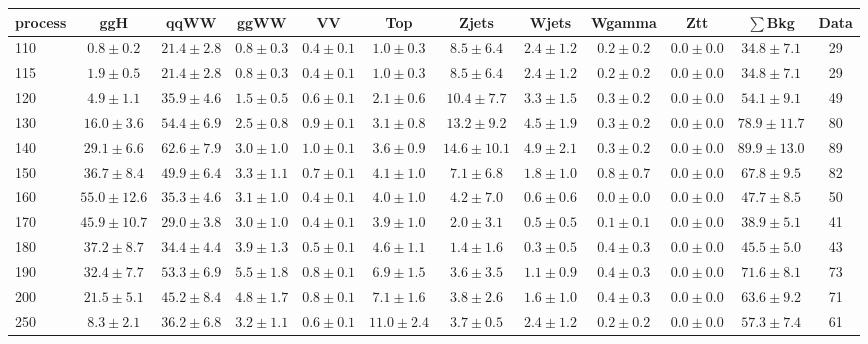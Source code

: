 \begin{table}
{\tiny
 \tiny
 \begin{center}
 \begin{tabular}{l c c c c c c c c c c c }
 \hline
 process & ggH & qqWW & ggWW & VV & Top & Zjets & Wjets & Wgamma & Ztt & $\sum$Bkg & Data \\
 \hline
110 & $0.8\pm0.2$ & $21.4\pm2.8$ & $0.8\pm0.3$ & $0.4\pm0.1$ & $1.0\pm0.3$ & $8.5\pm6.4$ & $2.4\pm1.2$ & $0.2\pm0.2$ & $0.0\pm0.0$ & $34.8\pm7.1$ & 29 \\
115 & $1.9\pm0.5$ & $21.4\pm2.8$ & $0.8\pm0.3$ & $0.4\pm0.1$ & $1.0\pm0.3$ & $8.5\pm6.4$ & $2.4\pm1.2$ & $0.2\pm0.2$ & $0.0\pm0.0$ & $34.8\pm7.1$ & 29 \\
120 & $4.9\pm1.1$ & $35.9\pm4.6$ & $1.5\pm0.5$ & $0.6\pm0.1$ & $2.1\pm0.6$ & $10.4\pm7.7$ & $3.3\pm1.5$ & $0.3\pm0.2$ & $0.0\pm0.0$ & $54.1\pm9.1$ & 49 \\
130 & $16.0\pm3.6$ & $54.4\pm6.9$ & $2.5\pm0.8$ & $0.9\pm0.1$ & $3.1\pm0.8$ & $13.2\pm9.2$ & $4.5\pm1.9$ & $0.3\pm0.2$ & $0.0\pm0.0$ & $78.9\pm11.7$ & 80 \\
140 & $29.1\pm6.6$ & $62.6\pm7.9$ & $3.0\pm1.0$ & $1.0\pm0.1$ & $3.6\pm0.9$ & $14.6\pm10.1$ & $4.9\pm2.1$ & $0.3\pm0.2$ & $0.0\pm0.0$ & $89.9\pm13.0$ & 89 \\
150 & $36.7\pm8.4$ & $49.9\pm6.4$ & $3.3\pm1.1$ & $0.7\pm0.1$ & $4.1\pm1.0$ & $7.1\pm6.8$ & $1.8\pm1.0$ & $0.8\pm0.7$ & $0.0\pm0.0$ & $67.8\pm9.5$ & 82 \\
160 & $55.0\pm12.6$ & $35.3\pm4.6$ & $3.1\pm1.0$ & $0.4\pm0.1$ & $4.0\pm1.0$ & $4.2\pm7.0$ & $0.6\pm0.6$ & $0.0\pm0.0$ & $0.0\pm0.0$ & $47.7\pm8.5$ & 50 \\
170 & $45.9\pm10.7$ & $29.0\pm3.8$ & $3.0\pm1.0$ & $0.4\pm0.1$ & $3.9\pm1.0$ & $2.0\pm3.1$ & $0.5\pm0.5$ & $0.1\pm0.1$ & $0.0\pm0.0$ & $38.9\pm5.1$ & 41 \\
180 & $37.2\pm8.7$ & $34.4\pm4.4$ & $3.9\pm1.3$ & $0.5\pm0.1$ & $4.6\pm1.1$ & $1.4\pm1.6$ & $0.3\pm0.5$ & $0.4\pm0.3$ & $0.0\pm0.0$ & $45.5\pm5.0$ & 43 \\
190 & $32.4\pm7.7$ & $53.3\pm6.9$ & $5.5\pm1.8$ & $0.8\pm0.1$ & $6.9\pm1.5$ & $3.6\pm3.5$ & $1.1\pm0.9$ & $0.4\pm0.3$ & $0.0\pm0.0$ & $71.6\pm8.1$ & 73 \\
200 & $21.5\pm5.1$ & $45.2\pm8.4$ & $4.8\pm1.7$ & $0.8\pm0.1$ & $7.1\pm1.6$ & $3.8\pm2.6$ & $1.6\pm1.0$ & $0.4\pm0.3$ & $0.0\pm0.0$ & $63.6\pm9.2$ & 71 \\
250 & $8.3\pm2.1$ & $36.2\pm6.8$ & $3.2\pm1.1$ & $0.6\pm0.1$ & $11.0\pm2.4$ & $3.7\pm0.5$ & $2.4\pm1.2$ & $0.2\pm0.2$ & $0.0\pm0.0$ & $57.3\pm7.4$ & 61 \\

\end{tabular}
\end{center}}
\end{table}
